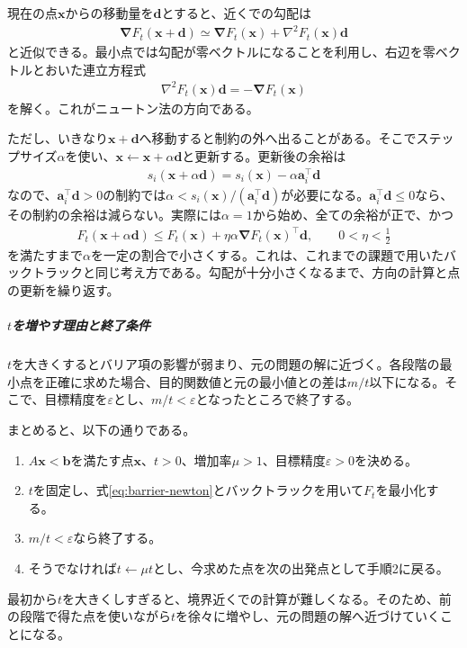 \documentclass[a4j]{jarticle}
\begin{document}
現在の点$\bm{x}$からの移動量を$\bm{d}$とすると、近くでの勾配は
\begin{align}
  \bm{\nabla} F_t(\bm{x}+\bm{d})\simeq\bm{\nabla} F_t(\bm{x})+\nabla^2F_t(\bm{x})\bm{d}
\end{align}
と近似できる。最小点では勾配が零ベクトルになることを利用し、右辺を零ベクトルとおいた連立方程式
\begin{align}
  \nabla^2F_t(\bm{x})\bm{d}=-\bm{\nabla} F_t(\bm{x})
  \label{eq:barrier-newton}
\end{align}
を解く。これがニュートン法の方向である。

ただし、いきなり$\bm{x}+\bm{d}$へ移動すると制約の外へ出ることがある。そこでステップサイズ$\alpha$を使い、$\bm{x}\leftarrow \bm{x}+\alpha \bm{d}$と更新する。更新後の余裕は
\begin{align}
  s_i(\bm{x}+\alpha \bm{d})=s_i(\bm{x})-\alpha \bm{a}_i^\top \bm{d}
\end{align}
なので、$\bm{a}_i^\top \bm{d}>0$の制約では$\alpha<s_i(\bm{x})/(\bm{a}_i^\top \bm{d})$が必要になる。$\bm{a}_i^\top \bm{d}\le0$なら、その制約の余裕は減らない。実際には$\alpha=1$から始め、全ての余裕が正で、かつ
\begin{align}
  F_t(\bm{x}+\alpha \bm{d})
  \le F_t(\bm{x})+\eta\alpha\bm{\nabla} F_t(\bm{x})^\top \bm{d},
  \qquad 0<\eta<\frac12
\end{align}
を満たすまで$\alpha$を一定の割合で小さくする。これは、これまでの課題で用いたバックトラックと同じ考え方である。勾配が十分小さくなるまで、方向の計算と点の更新を繰り返す。

\subparagraph{$t$を増やす理由と終了条件}
$t$を大きくするとバリア項の影響が弱まり、元の問題の解に近づく。各段階の最小点を正確に求めた場合、目的関数値と元の最小値との差は$m/t$以下になる。そこで、目標精度を$\varepsilon$とし、$m/t<\varepsilon$となったところで終了する。

まとめると、以下の通りである。
\begin{enumerate}
  \item $A\bm{x}<\bm{b}$を満たす点$\bm{x}$、$t>0$、増加率$\mu>1$、目標精度$\varepsilon>0$を決める。
  \item $t$を固定し、式\eqref{eq:barrier-newton}とバックトラックを用いて$F_t$を最小化する。
  \item $m/t<\varepsilon$なら終了する。
  \item そうでなければ$t\leftarrow\mu t$とし、今求めた点を次の出発点として手順2に戻る。
\end{enumerate}
最初から$t$を大きくしすぎると、境界近くでの計算が難しくなる。そのため、前の段階で得た点を使いながら$t$を徐々に増やし、元の問題の解へ近づけていくことになる。
\end{document}
